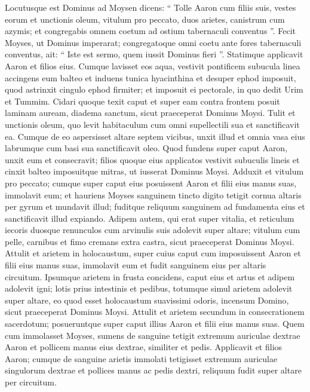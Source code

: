 \begin{biblechapter}
\begin{biblechapter}
\begin{biblechapter}
\begin{biblechapter}
\begin{biblechapter}
\begin{biblechapter}
\begin{biblechapter}
\begin{biblechapter}
\verse Locutusque est Dominus ad Moysen dicens: 
\verse “ Tolle Aaron cum filiis suis, vestes eorum et unctionis oleum, vitulum pro peccato, duos arietes, canistrum cum azymis; 
\verse et congregabis omnem coetum ad ostium tabernaculi conventus ”. 
\verse Fecit Moyses, ut Dominus imperarat; congregatoque omni coetu ante fores tabernaculi conventus, 
\verse ait: “ Iste est sermo, quem iussit Dominus fieri ”.
 \verse Statimque applicavit Aaron et filios eius. Cumque lavisset eos aqua, 
\verse vestivit pontificem subucula linea accingens eum balteo et induens tunica hyacinthina et desuper ephod imposuit, 
\verse quod astrinxit cingulo ephod firmiter; et imposuit ei pectorale, in quo dedit Urim et Tummim. 
\verse Cidari quoque texit caput et super eam contra frontem posuit laminam auream, diadema sanctum, sicut praeceperat Dominus Moysi.
 \verse Tulit et unctionis oleum, quo levit habitaculum cum omni supellectili sua et sanctificavit ea. 
\verse Cumque de eo aspersisset altare septem vicibus, unxit illud et omnia vasa eius labrumque cum basi sua sanctificavit oleo. 
\verse Quod fundens super caput Aaron, unxit eum et consecravit; 
\verse filios quoque eius applicatos vestivit subuculis lineis et cinxit balteo imposuitque mitras, ut iusserat Dominus Moysi.
 \verse Adduxit et vitulum pro peccato; cumque super caput eius posuissent Aaron et filii eius manus suas, 
\verse immolavit eum; et hauriens Moyses sanguinem tincto digito tetigit cornua altaris per gyrum et mundavit illud; fuditque reliquum sanguinem ad fundamenta eius et sanctificavit illud expiando. 
\verse Adipem autem, qui erat super vitalia, et reticulum iecoris duosque renunculos cum arvinulis suis adolevit super altare; 
\verse vitulum cum pelle, carnibus et fimo cremans extra castra, sicut praeceperat Dominus Moysi.
 \verse Attulit et arietem in holocaustum, super cuius caput cum imposuissent Aaron et filii eius manus suas, 
\verse immolavit eum et fudit sanguinem eius per altaris circuitum. 
\verse Ipsumque arietem in frusta concidens, caput eius et artus et adipem adolevit igni; 
\verse lotis prius intestinis et pedibus, totumque simul arietem adolevit super altare, eo quod esset holocaustum suavissimi odoris, incensum Domino, sicut praeceperat Dominus Moysi.
 \verse Attulit et arietem secundum in consecrationem sacerdotum; posueruntque super caput illius Aaron et filii eius manus suas. 
\verse Quem cum immolasset Moyses, sumens de sanguine tetigit extremum auriculae dextrae Aaron et pollicem manus eius dextrae, similiter et pedis. 
\verse Applicavit et filios Aaron; cumque de sanguine arietis immolati tetigisset extremum auriculae singulorum dextrae et pollices manus ac pedis dextri, reliquum fudit super altare per circuitum. 

\end{biblechapter}
\end{biblechapter}
\end{biblechapter}
\end{biblechapter}
\end{biblechapter}
\end{biblechapter}
\end{biblechapter}
\end{biblechapter}
